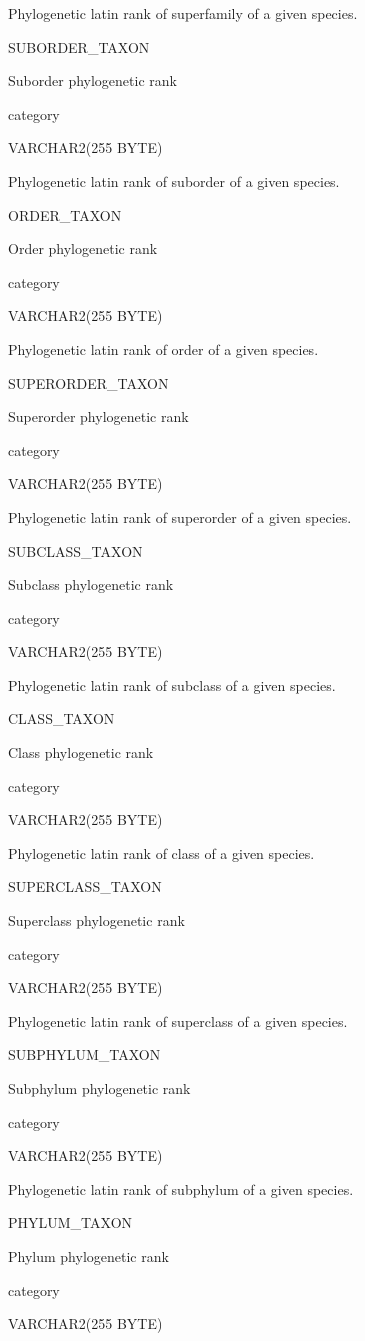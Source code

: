 \documentclass[
  letterpaper,
  oneside,
  open=any]{scrbook}
\begin{document}
Phylogenetic latin rank of superfamily of a given species.

SUBORDER\_TAXON

Suborder phylogenetic rank

category

VARCHAR2(255 BYTE)

Phylogenetic latin rank of suborder of a given species.

ORDER\_TAXON

Order phylogenetic rank

category

VARCHAR2(255 BYTE)

Phylogenetic latin rank of order of a given species.

SUPERORDER\_TAXON

Superorder phylogenetic rank

category

VARCHAR2(255 BYTE)

Phylogenetic latin rank of superorder of a given species.

SUBCLASS\_TAXON

Subclass phylogenetic rank

category

VARCHAR2(255 BYTE)

Phylogenetic latin rank of subclass of a given species.

CLASS\_TAXON

Class phylogenetic rank

category

VARCHAR2(255 BYTE)

Phylogenetic latin rank of class of a given species.

SUPERCLASS\_TAXON

Superclass phylogenetic rank

category

VARCHAR2(255 BYTE)

Phylogenetic latin rank of superclass of a given species.

SUBPHYLUM\_TAXON

Subphylum phylogenetic rank

category

VARCHAR2(255 BYTE)

Phylogenetic latin rank of subphylum of a given species.

PHYLUM\_TAXON

Phylum phylogenetic rank

category

VARCHAR2(255 BYTE)
\end{document}
